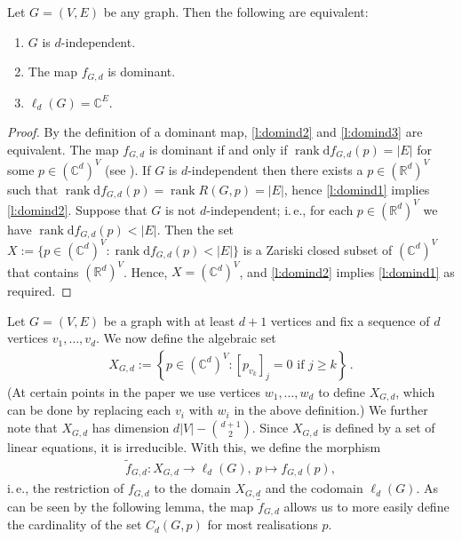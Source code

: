 \documentclass[ALCO]{cedram}
\DeclareMathOperator{\rank}{rank}
\newcommand{\diff}{\mathrm{d}}
\begin{document}
\begin{lemma}\label{l:domind}
	Let $G=(V,E)$ be any graph.
	Then the following are equivalent:
	\begin{enumerate}
		\item \label{l:domind1} $G$ is $d$-independent.
		\item \label{l:domind2} The map $f_{G,d}$ is dominant.
		\item \label{l:domind3} $\ell_d(G) = \mathbb{C}^E$.
	\end{enumerate}
\end{lemma} 

\begin{proof}
	By the definition of a dominant map, \ref{l:domind2} and \ref{l:domind3} are equivalent.
	The map $f_{G,d}$ is dominant if and only if $\rank \diff f_{G,d}(p) = |E|$ for some $p \in (\mathbb{C}^{d})^V$ (see ).
	If $G$ is $d$-independent then there exists a $p \in (\mathbb{R}^{d})^V$ such that $\rank \diff f_{G,d}(p) = \rank R(G,p) = |E|$,
	hence \ref{l:domind1} implies \ref{l:domind2}.
	Suppose that $G$ is not $d$-independent;
	i.\,e., for each $p \in (\mathbb{R}^{d})^V$ we have $\rank \diff f_{G,d}(p) < |E|$.
	Then the set $X := \{ p \in (\mathbb{C}^{d})^V: \rank \diff f_{G,d}(p) < |E| \}$ is a Zariski closed subset of $(\mathbb{C}^{d})^V$ that contains $(\mathbb{R}^{d})^V$.
	Hence, $X = (\mathbb{C}^{d})^V$,
	and \ref{l:domind2} implies \ref{l:domind1} as required.
\end{proof}

Let $G=(V,E)$ be a graph with at least $d+1$ vertices and fix a sequence of $d$ vertices $v_1,\ldots, v_d$.
We now define the algebraic set
\begin{align}\label{eq:xset}
	X_{G,d} := \left\{ p \in (\mathbb{C}^{d})^V : [p_{v_k}]_j=0 \text{ if } j \geq k  \right\}\,.
\end{align}
(At certain points in the paper we use vertices $w_1,\ldots,w_d$ to define $X_{G,d}$,
which can be done by replacing each $v_i$ with $w_i$ in the above definition.)
We further note that $X_{G,d}$ has dimension $d|V| - \binom{d+1}{2}$.
Since $X_{G,d}$ is defined by a set of linear equations,
it is irreducible.
With this, we define the morphism
\begin{align*}
	\tilde{f}_{G,d} : X_{G,d} \rightarrow \ell_d(G), ~ p \mapsto f_{G,d}(p),
\end{align*}
i.\,e., the restriction of $f_{G,d}$ to the domain $X_{G,d}$ and the codomain $\ell_d(G)$.
As can be seen by the following lemma, the map $\tilde{f}_{G,d}$ allows us to more easily define the cardinality of the set $C_d(G,p)$ for most realisations $p$.
\end{document}
